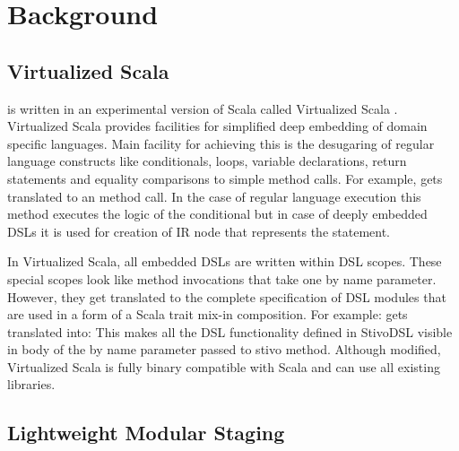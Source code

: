 \section{Background}
\label{sec:background}

\subsection{Virtualized Scala}
\label{subsec:virtualized-scala}
\tool is written in an experimental version of Scala called Virtualized Scala \cite{sv}. Virtualized Scala provides facilities for simplified deep embedding of domain specific languages. Main facility for achieving this is the desugaring of regular language constructs like conditionals, loops, variable declarations, return statements and equality comparisons to simple method calls. For example,  gets translated to an  method call. In the case of regular language execution this method executes the logic of the conditional but in case of deeply embedded DSLs it is used for creation of  IR node that represents the  statement.  

In Virtualized Scala, all embedded DSLs are written within DSL scopes. These special scopes look like method invocations that take one by name parameter. However, they get translated to the complete specification of DSL modules that are used in a form of a Scala trait mix-in composition. For example: 
 gets translated into:
This makes all the DSL functionality defined in StivoDSL visible in body of the by name parameter passed to stivo method. 
Although modified, Virtualized Scala is fully binary compatible with Scala and can use all existing libraries.  

  

\subsection{Lightweight Modular Staging}
\label{subsec:lightweight-modular-staging}

